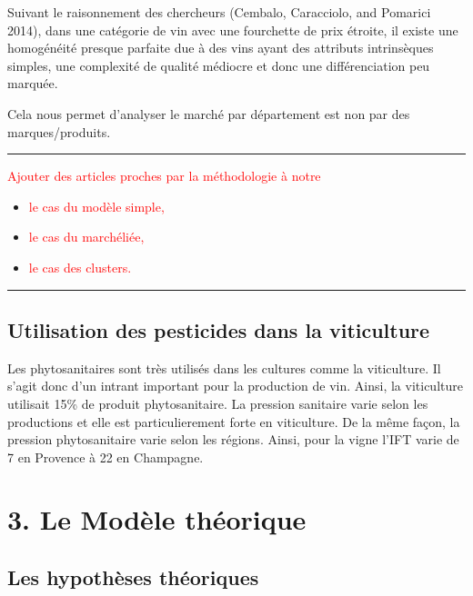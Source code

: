 \documentclass[11pt,]{article}
\providecommand{\tightlist}{%
  \setlength{\itemsep}{0pt}\setlength{\parskip}{0pt}}
\begin{document}
Suivant le raisonnement des chercheurs (Cembalo, Caracciolo, and
Pomarici 2014), dans une catégorie de vin avec une fourchette de prix
étroite, il existe une homogénéité presque parfaite due à des vins ayant
des attributs intrinsèques simples, une complexité de qualité médiocre
et donc une différenciation peu marquée.

Cela nous permet d'analyser le marché par département est non par des
marques/produits.

\noindent

\rule[0.5ex]{\linewidth}{1pt}

\textcolor{red}{Ajouter des articles proches par la méthodologie à notre }

\begin{itemize}
\tightlist
\item
  \textcolor{red}{le cas du modèle simple,  }
\item
  \textcolor{red}{le cas du marchéliée, }
\item
  \textcolor{red}{le cas des clusters.}
\end{itemize}

\noindent

\rule[0.5ex]{\linewidth}{1pt}

\hypertarget{utilisation-des-pesticides-dans-la-viticulture}{%
\subsection{Utilisation des pesticides dans la
viticulture}\label{utilisation-des-pesticides-dans-la-viticulture}}

Les phytosanitaires sont très utilisés dans les cultures comme la
viticulture. Il s'agit donc d'un intrant important pour la production de
vin. Ainsi, la viticulture utilisait 15\% de produit phytosanitaire. La
pression sanitaire varie selon les productions et elle est
particulierement forte en viticulture. De la même façon, la pression
phytosanitaire varie selon les régions. Ainsi, pour la vigne l'IFT varie
de 7 en Provence à 22 en Champagne.

\hypertarget{le-modele-theorique}{%
\section{3. Le Modèle théorique}\label{le-modele-theorique}}

\hypertarget{les-hypotheses-theoriques}{%
\subsection{Les hypothèses théoriques}\label{les-hypotheses-theoriques}}
\end{document}
